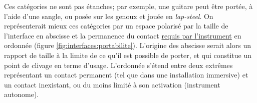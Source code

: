 \par
\noindent Ces catégories ne sont pas étanches; par exemple, une guitare peut être portée, à l'aide d'une sangle, ou posée sur les genoux et jouée en \textit{lap-steel}. On représenterait mieux ces catégories par un espace polarisé par la taille de l'interface en abscisse et la permanence du contact \underline{requis par l'instrument} en ordonnée (figure \ref{fig:interfaces:portabilite}). L'origine des abscisse serait alors un rapport de taille à la limite de ce qu'il est possible de porter, et qui constitue un point de clivage en terme d'usage. L'ordonnée s'étend entre deux extrêmes représentant un contact permanent (tel que dans une installation immersive) et un contact inexistant, ou du moins limité à son activation (instrument autonome).







